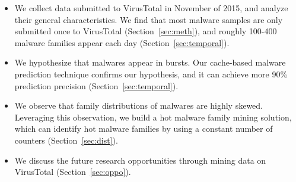 \begin{itemize}

\item We collect data submitted to VirusTotal in November of 2015, 
and analyze their general characteristics. 
We find that most malware samples are only submitted once to VirusTotal (Section~\ref{sec:meth}), 
and roughly 100-400 malware families appear each day (Section~\ref{sec:temporal}). 

\item We hypothesize that malwares appear in bursts. 
Our cache-based malware prediction technique confirms our hypothesis, 
and it can achieve more 90\% prediction precision (Section~\ref{sec:temporal}). 

\item We observe that family distributions of malwares are highly skewed. 
Leveraging this observation, we build a hot malware family mining solution, 
which can identify hot malware families by using a constant number of counters (Section~\ref{sec:dist}).

\item We discuss the future research opportunities through mining data on VirusTotal (Section~\ref{sec:oppo}). 

\end{itemize}


